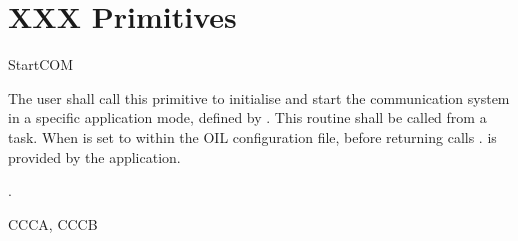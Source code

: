 




\pagebreak


\section{XXX Primitives}


\pagebreak


\begin{function}{StartCOM}
  \begin{fundescription}
    The user shall call this primitive to initialise and start the
    communication system in a specific application mode, defined by
    . This routine shall be called from a task. When
     is set to  within the OIL
    configuration file, before returning  calls
    .  is provided
    by the application.
  \end{fundescription}
  \begin{funparameters}
  \end{funparameters}
  \begin{funreturn}
    .
  \end{funreturn}
  \begin{funconformance}
    CCCA, CCCB
  \end{funconformance}
\end{function}

